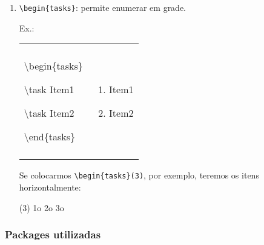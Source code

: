 \documentclass[12pt,a4paper]{article}
\newenvironment{caixa2}
    {\begin{center}
    \begin{tabular}{|p{0.5\textwidth}|p{0.36\textwidth}|}
    \hline\\
    }
    { 
    \\\\\hline
    \end{tabular} 
    \end{center}
    }
\begin{document}
\begin{enumerate}[label=\roman*.]
\subparagraph{\textit{Labels} permitem modificar o estilo de enumeração. Usamos comumente os seguintes:} 

\begin{tasks}(2)
\task \texttt{\textbackslash alph*} - (a, b, c \dots)
\task \texttt{\textbackslash Alph*} - (A, B, C \dots)
\task \texttt{\textbackslash arabic*} - (1, 2, 3 \dots)
\task \texttt{\textbackslash roman*} - (i, ii, iii \dots)
\end{tasks}

É possível personalizar a enumeração do \texttt{enumerate} utilizando o argumento \texttt{[label= algumacoisa ]}. Por exemplo, experimente por \texttt{[label= \textbackslash arabic*o item:]} e veja o resultado.

\item \texttt{\textbackslash begin\{tasks\}}: permite enumerar em grade.

Ex.: 

\begin{caixa2}
\textbackslash begin\{tasks\}

\textbackslash task Item1

\textbackslash task Item2

\textbackslash end\{tasks\} & \begin{enumerate}[label=\alph*)]
\item Item1
\item Item2
\end{enumerate}
\end{caixa2}

Se colocarmos \texttt{\textbackslash begin\{tasks\}(3)}, por exemplo, teremos os itens horizontalmente:

\begin{tasks}(3)
\task 1o
\task 2o
\task 3o
\end{tasks}

\end{enumerate}

\subsubsection{Packages utilizadas}
\end{document}
